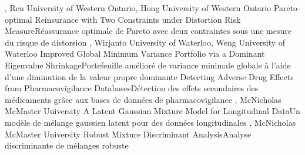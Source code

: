 
{
,  {Ren}
{University of Western Ontario},  {Hong}
{University of Western Ontario}
}
{Pareto-optimal Reinsurance with Two Constraints under Distortion Risk Measure}{Réassurance optimale de Pareto avec deux contraintes sous une mesure du risque de distorsion}
{\bubbleE \enspace \screenE}
{
,  {Wirjanto}
{University of Waterloo},  {Weng}
{University of Waterloo}
}
{Improved Global Minimum Variance Portfolio via a Dominant Eigenvalue Shrinkage}{Portefeuille amélioré de variance minimale globale à l’aide d’une diminution de la valeur propre dominante}
{\bubbleE \enspace \screenE}
{
}
{Detecting Adverse Drug Effects from Pharmacovigilance Databases}{Détection des effets secondaires des médicaments grâce aux bases de données de pharmacovigilance}
{\bubbleE \enspace \screenE}
{
,  {McNicholas}
{McMaster University}
}
{A Latent Gaussian Mixture Model for Longitudinal Data}{Un modèle de mélange gaussien latent pour des données longitudinales }
{\bubbleE \enspace \screenE}
{
,  {McNicholas}
{McMaster University}
}
{Robust Mixture Discriminant Analysis}{Analyse discriminante de mélanges robuste}
{\bubbleE \enspace \screenE}


